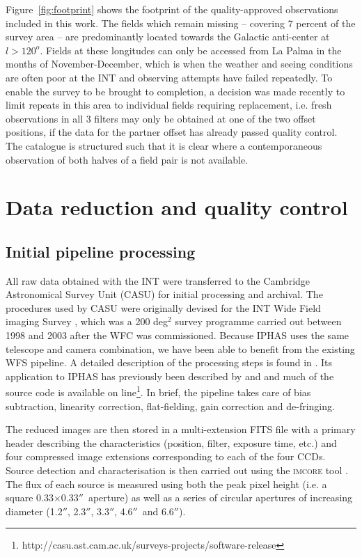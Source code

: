 \documentclass[useAMS,usenatbib]{mn2e}
\def\arcsec{$''$}
\begin{document}
Figure~\ref{fig:footprint} shows the footprint 
of the quality-approved observations included in this work. 
The fields which remain missing 
-- covering 7 percent of the survey area --
are predominantly located towards the Galactic anti-center 
at $l > 120^o$.
Fields at these longitudes can only be accessed from La Palma 
in the months of November-December,
which is when the weather and seeing conditions are often poor
at the INT and observing attempts have failed repeatedly.
To enable the survey to be brought to completion, 
a decision was made recently to limit repeats in this area 
to individual fields requiring replacement,
i.e. fresh observations in all 3 filters may only be obtained 
at one of the two offset positions, 
if the data for the partner offset has already passed quality control.  
The catalogue is structured such that it is clear 
where a contemporaneous observation of both halves of a field pair
is not available.


\section{Data reduction and quality control}
\label{sec:reduction}

\subsection{Initial pipeline processing}

All raw data obtained with the INT were transferred
to the Cambridge Astronomical Survey Unit (CASU) 
for initial processing and archival.
The procedures used by CASU were originally devised
for the INT Wide Field imaging Survey \citep[WFS;][]{McMahon2001,Irwin2005},
which was a 200 deg$^2$ survey programme carried out 
between 1998 and 2003 after the WFC was commissioned.
Because IPHAS uses the same telescope and camera combination,
we have been able to benefit from the existing WFS pipeline.
A detailed description of the processing steps 
is found in \citet{Irwin2001}.
Its application to IPHAS has previously been described
by \citet{Drew2005} and \citet{Gonzalez-Solares2008}
and much of the source code is available 
on line\footnote{http://casu.ast.cam.ac.uk/surveys-projects/software-release}. 
In brief, the pipeline takes care of bias subtraction,
linearity correction, flat-fielding,
gain correction and de-fringing.

The reduced images are then stored in a multi-extension FITS file 
with a primary header describing the characteristics
(position, filter, exposure time, etc.) 
and four compressed image extensions 
corresponding to each of the four CCDs.
Source detection and characterisation is then carried out 
using the \textsc{imcore} tool \citep{Irwin1985,Irwin1997}.
The flux of each source is measured using both
the peak pixel height (i.e. a square 0.33$\times$0.33\arcsec\ aperture)
as well as a series of circular apertures of increasing diameter 
(1.2\arcsec, 2.3\arcsec, 3.3\arcsec, 4.6\arcsec\ and 6.6\arcsec).
\end{document}
